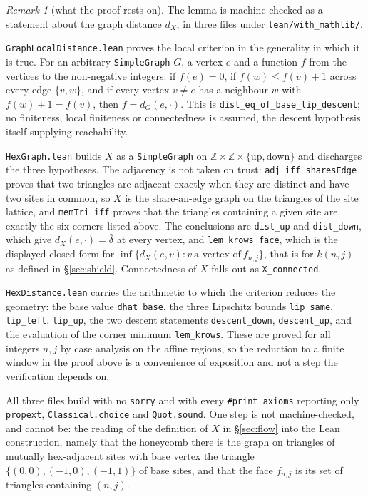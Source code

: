 \documentclass[11pt]{article}
\theoremstyle{definition}
\theoremstyle{remark}
\newtheorem{remark}[theorem]{Remark}
\newcommand{\Z}{\mathbb{Z}}
\begin{document}
\begin{remark}[what the proof rests on]\label{rem:krows-status}
The lemma is machine-checked as a statement about the graph distance $d_X$, in three files
under \texttt{lean/with\_mathlib/}.

\texttt{GraphLocalDistance.lean} proves the local criterion in the generality in which it is
true. For an arbitrary \texttt{SimpleGraph} $G$, a vertex $e$ and a function $f$ from the
vertices to the non-negative integers: if $f(e)=0$, if $f(w)\le f(v)+1$ across every edge
$\{v,w\}$, and if every vertex $v\ne e$ has a neighbour $w$ with $f(w)+1=f(v)$, then
$f=d_G(e,\cdot)$. This is \texttt{dist\_eq\_of\_base\_lip\_descent}; no finiteness,
local finiteness or connectedness is assumed, the descent hypothesis itself supplying
reachability.

\texttt{HexGraph.lean} builds $X$ as a \texttt{SimpleGraph} on
$\Z\times\Z\times\{\mathrm{up},\mathrm{down}\}$ and discharges the three hypotheses. The
adjacency is not taken on trust: \texttt{adj\_iff\_sharesEdge} proves that two triangles are
adjacent exactly when they are distinct and have two sites in common, so $X$ is the
share-an-edge graph on the triangles of the site lattice, and \texttt{memTri\_iff} proves that
the triangles containing a given site are exactly the six corners listed above. The
conclusions are \texttt{dist\_up} and \texttt{dist\_down}, which give
$d_X(e,\cdot)=\widehat\delta$ at every vertex, and \texttt{lem\_krows\_face}, which is the
displayed closed form for $\inf\{d_X(e,v):v\ \text{a vertex of}\ f_{n,j}\}$, that is for
$k(n,j)$ as defined in \S\ref{sec:shield}. Connectedness of $X$ falls out as
\texttt{X\_connected}.

\texttt{HexDistance.lean} carries the arithmetic to which the criterion reduces the geometry:
the base value \texttt{dhat\_base}, the three Lipschitz bounds \texttt{lip\_same},
\texttt{lip\_left}, \texttt{lip\_up}, the two descent statements \texttt{descent\_down},
\texttt{descent\_up}, and the evaluation of the corner minimum \texttt{lem\_krows}. These are
proved for all integers $n,j$ by case analysis on the affine regions, so the reduction to a
finite window in the proof above is a convenience of exposition and not a step the
verification depends on.

All three files build with no \texttt{sorry} and with every \texttt{\#print axioms} reporting
only \texttt{propext}, \texttt{Classical.choice} and \texttt{Quot.sound}. One step is not
machine-checked, and cannot be: the reading of the definition of $X$ in \S\ref{sec:flow} into
the Lean construction, namely that the honeycomb there is the graph on triangles of mutually
hex-adjacent sites with base vertex the triangle $\{(0,0),(-1,0),(-1,1)\}$ of base sites, and
that the face $f_{n,j}$ is its set of triangles containing $(n,j)$.


\end{remark}
\end{document}

